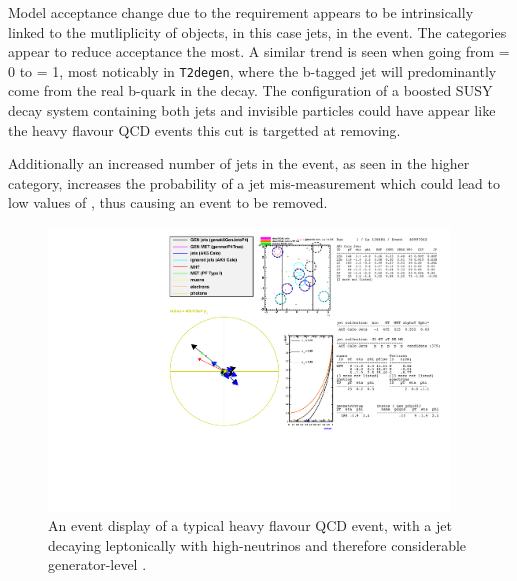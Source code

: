 Model acceptance change due to the requirement appears to be intrinsically
linked to the mutliplicity of objects, in this case jets, in the event. The
\njhigh categories appear to reduce acceptance the most. A similar trend is
seen when going from \nb = 0 to \nb = 1, most noticably in \texttt{T2degen},
where the b-tagged jet will predominantly come from the real b-quark in the
decay. The configuration of a boosted SUSY decay system containing both jets and
invisible \chiz particles could have appear like the heavy flavour QCD events
this cut is targetted at removing. 

Additionally an increased number of jets in the event, as seen in the higher \nj
category, increases the probability of a jet mis-measurement which could lead to
low values of \mindphistar, thus causing an event to be removed.

\clearpage
\begin{figure}
    \centering
    \includegraphics[width=0.95\textwidth]
    {Figs/eventDisplays/Had_QCD_MG_MC_HT375_skim_displays_singleEvent_2_noPF.pdf}
    \caption{An event display of a typical heavy flavour QCD event, with a jet
    decaying leptonically with high-\Pt neutrinos and therefore considerable
    generator-level \met.}
    \label{fig:event_display_QCD}
\end{figure}
